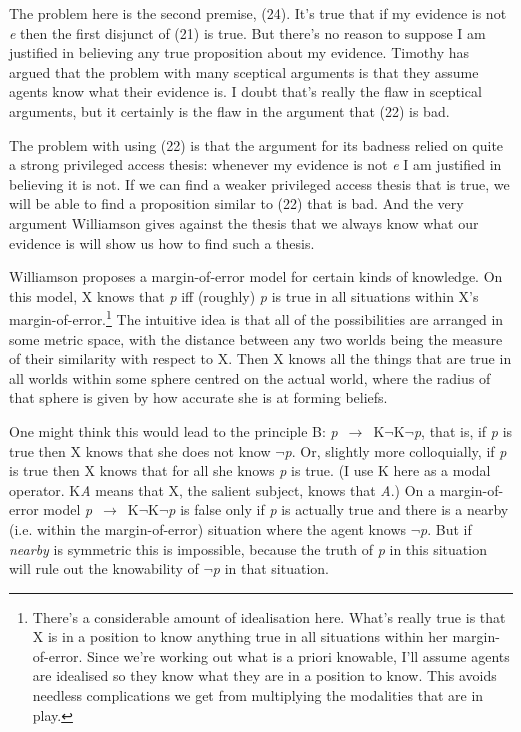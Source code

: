 \noindent The problem here is the second premise, (24). It's true that if my evidence is not \textit{e} then the first disjunct of (21) is true. But there's no reason to suppose I am justified in believing any true proposition about my evidence. Timothy \cite[ch. 8]{Williamson2000-WILKAI} has argued that the problem with many sceptical arguments is that they assume agents know what their evidence is. I doubt that's really the flaw in sceptical arguments, but it certainly is the flaw in the argument that (22) is bad.

The problem with using (22) is that the argument for its badness relied on quite a strong privileged access thesis: whenever my evidence is not \textit{e} I am justified in believing it is not. If we can find a weaker privileged access thesis that is true, we will be able to find a proposition similar to (22) that is bad. And the very argument Williamson gives against the thesis that we always know what our evidence is will show us how to find such a thesis.{ }

Williamson proposes a margin-of-error model for certain kinds of knowledge. On this model, X knows that \textit{p} iff (roughly) \textit{p} is true in all situations within X's margin-of-error.\footnote{There's a considerable amount of idealisation here. What's really true is that X is in a position to know anything true in all situations within her margin-of-error. Since we're working out what is a priori knowable, I'll assume agents are idealised so they know what they are in a position to know. This avoids needless complications we get from multiplying the modalities that are in play.} The intuitive idea is that all of the possibilities are arranged in some metric space, with the distance between any two worlds being the measure of their similarity with respect to X. Then X knows all the things that are true in all worlds within some sphere centred on the actual world, where the radius of that sphere is given by how accurate she is at forming beliefs. 

One might think this would lead to the principle B: \textit{p}~${\rightarrow}$~K\(\neg\)K\(\neg\)\textit{p}, that is, if \textit{p} is true then X knows that she does not know \(\neg\)\textit{p}. Or, slightly more colloquially, if \textit{p} is true then X knows that for all she knows \textit{p} is true. (I use K here as a modal operator. K\textit{A} means that X, the salient subject, knows that \textit{A}.) On a margin-of-error model \textit{p}~${\rightarrow}$~K\(\neg\)K\(\neg\)\textit{p} is false only if \textit{p} is actually true and there is a nearby (i.e. within the margin-of-error) situation where the agent knows \(\neg\)\textit{p}. But if \textit{nearby} is symmetric this is impossible, because the truth of \textit{p} in this situation will rule out the knowability of \(\neg\)\textit{p} in that situation.

